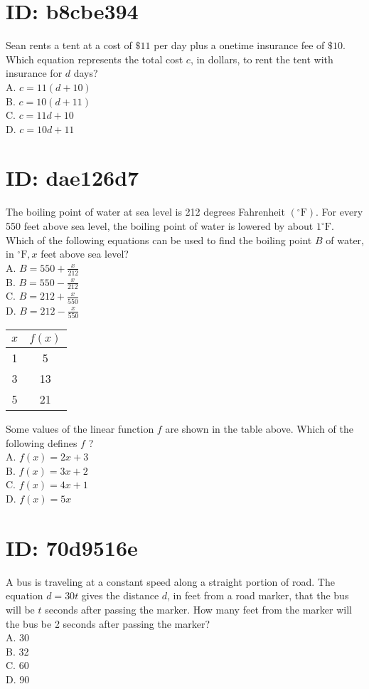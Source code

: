 \section*{ID: b8cbe394}
Sean rents a tent at a cost of $\$ 11$ per day plus a onetime insurance fee of $\$ 10$. Which equation represents the total cost $c$, in dollars, to rent the tent with insurance for $d$ days?\\
A. $c=11(d+10)$\\
B. $c=10(d+11)$\\
C. $c=11 d+10$\\
D. $c=10 d+11$

\section*{ID: dae126d7}
The boiling point of water at sea level is 212 degrees Fahrenheit $\left({ }^{\circ} \mathrm{F}\right)$. For every 550 feet above sea level, the boiling point of water is lowered by about $1^{\circ} \mathrm{F}$. Which of the following equations can be used to find the boiling point $B$ of water, in ${ }^{\circ} \mathrm{F}, x$ feet above sea level?\\
A. $B=550+\frac{x}{212}$\\
B. $B=550-\frac{x}{212}$\\
C. $B=212+\frac{x}{550}$\\
D. $B=212-\frac{x}{550}$

\begin{center}
\begin{tabular}{|c|c|}
\hline
$x$ & $f(x)$ \\
\hline
1 & 5 \\
\hline
3 & 13 \\
\hline
5 & 21 \\
\hline
\end{tabular}
\end{center}

Some values of the linear function $f$ are shown in the table above. Which of the following defines $f$ ?\\
A. $f(x)=2 x+3$\\
B. $f(x)=3 x+2$\\
C. $f(x)=4 x+1$\\
D. $f(x)=5 x$

\section*{ID: 70d9516e}
A bus is traveling at a constant speed along a straight portion of road. The equation $d=30 t$ gives the distance $d$, in feet from a road marker, that the bus will be $t$ seconds after passing the marker. How many feet from the marker will the bus be 2 seconds after passing the marker?\\
A. 30\\
B. 32\\
C. 60\\
D. 90

